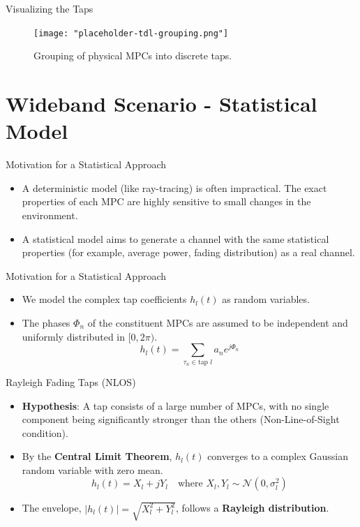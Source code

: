 \documentclass{beamer}
\begin{document}
	\begin{frame}{Visualizing the Taps}
		\begin{figure}
			\centering
			\texttt{[image: "placeholder-tdl-grouping.png"]}
			\caption{Grouping of physical MPCs into discrete taps.}
		\end{figure}
	\end{frame}
	
	\section{Wideband Scenario - Statistical Model}
	
	\begin{frame}{Motivation for a Statistical Approach}
		\begin{itemize}
			\item A deterministic model (like ray-tracing) is often impractical. The exact properties of each MPC are highly sensitive to small changes in the environment.
			\item A statistical model aims to generate a channel with the same statistical properties (for example, average power, fading distribution) as a real channel.
		\end{itemize}
	\end{frame}
	
	\begin{frame}{Motivation for a Statistical Approach}
		\begin{itemize}
			\item We model the complex tap coefficients $h_l(t)$ as random variables.
			\item The phases $\Phi_n$ of the constituent MPCs are assumed to be independent and uniformly distributed in $[0, 2\pi)$.
			\[ h_l(t) = \sum_{\tau_n \in \text{tap } l} a_n e^{j\Phi_n} \]
		\end{itemize}
	\end{frame}
	
	\begin{frame}{Rayleigh Fading Taps (NLOS)}
		\begin{itemize}
			\item \textbf{Hypothesis}: A tap consists of a large number of MPCs, with no single component being significantly stronger than the others (Non-Line-of-Sight condition).
			
			\item By the \textbf{Central Limit Theorem}, $h_l(t)$ converges to a complex Gaussian random variable with zero mean.
			\[ h_l(t) = X_l + jY_l \quad \text{where } X_l, Y_l \sim \mathcal{N}(0, \sigma_l^2) \]
			
			\item The envelope, $|h_l(t)| = \sqrt{X_l^2 + Y_l^2}$, follows a \textbf{Rayleigh distribution}.
		\end{itemize}
	\end{frame}
	
\end{document}
